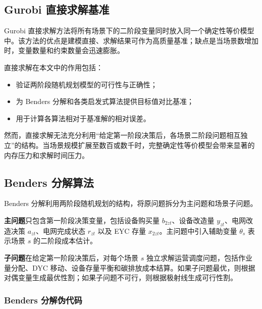 \documentclass[12pt,a4paper]{article}
\newcommand{\手批注}[2]{\textcolor{#1}{\text{\kaishu #2}}}
\newcommand{\一阶段}{\textcolor{firststage}{\text{\kaishu （一阶段）}}}
\newcommand{\二阶段}{\textcolor{secondstage}{\text{\kaishu （二阶段）}}}
\begin{document}
\subsection{Gurobi 直接求解基准}

Gurobi 直接求解方法将所有场景下的二阶段变量同时放入同一个确定性等价模型中。该方法的优点是建模直接、求解结果可作为高质量基准；缺点是当场景数增加时，变量数量和约束数量会迅速膨胀。

直接求解在本文中的作用包括：
\begin{itemize}[itemsep=0.2em,leftmargin=2em]
    \item 验证两阶段随机规划模型的可行性与正确性；
    \item 为 Benders 分解和各类启发式算法提供目标值对比基准；
    \item 用于计算各算法相对于基准解的相对误差。
\end{itemize}

然而，直接求解无法充分利用“给定第一阶段决策后，各场景二阶段问题相互独立”的结构。当场景规模扩展至数百或数千时，完整确定性等价模型会带来显著的内存压力和求解时间压力。

\subsection{Benders 分解算法}

Benders 分解利用两阶段随机规划的结构，将原问题拆分为主问题和场景子问题。

\textbf{主问题}只包含第一阶段决策变量，包括设备购买量 $b_{2zt}$、设备改造量 $y_{zt}$、电网改造决策 $a_{zt}$、电网完成状态 $r_{zt}$ 以及 EYC 存量 $x_{2zt}$。主问题中引入辅助变量 $\theta_s$ 表示场景 $s$ 的二阶段成本估计。

\textbf{子问题}在给定第一阶段决策后，对每个场景 $s$ 独立求解运营调度问题，包括作业量分配、DYC 移动、设备存量平衡和碳排放成本结算。如果子问题最优，则根据对偶变量生成最优性割；如果子问题不可行，则根据极射线生成可行性割。

\subsubsection{Benders 分解伪代码}
\end{document}
